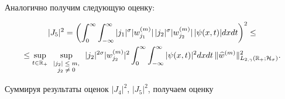 Аналогично  получим следующую оценку:

\begin{multline*}

|J_5|^2=\biggl(\int_0^\infty \int_{-\infty}^\infty 

 |j_1|^{\sigma}  |w_{j_1}^{(m)}| \, |j_2|^{\sigma} |w_{j_2}^{(m)}| \, |\psi(x,t)| dxdt\biggr)^2\le

\\

\le  \sup_{t\in \mathbb R_{+}}

\sup_{

\scriptsize

\begin{array}{c}

|j_2|\le m,\\ 

j_2\ne0

\end{array}

} |j_2|^{2\sigma} |w_{j_2}^{(m)}|^2 \int_0^\infty \int_{-\infty}^\infty 

|\psi(x,t)|^2 dxdt \,

 \|\widehat{w}^{(m)}\|^2_{L_{2,\gamma}(\mathbb R_{+}; {\cal H}_{\sigma})}.

\end{multline*}

Суммируя результаты  оценок $|J_4|^2$, $|J_5|^2$, получаем оценку

